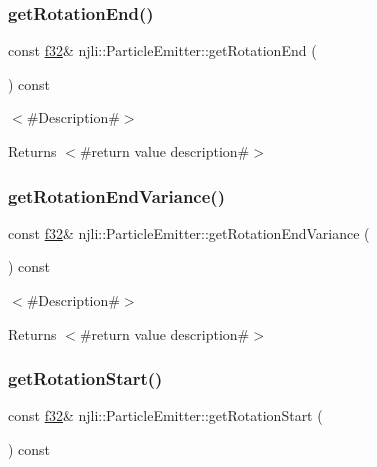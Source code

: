 \subsubsection{\texorpdfstring{get\+Rotation\+End()}{getRotationEnd()}}
{\footnotesize\ttfamily const \mbox{\hyperlink{_util_8h_a5f6906312a689f27d70e9d086649d3fd}{f32}}\& njli\+::\+Particle\+Emitter\+::get\+Rotation\+End (\begin{DoxyParamCaption}{ }\end{DoxyParamCaption}) const}

$<$\#\+Description\#$>$

\begin{DoxyReturn}{Returns}
$<$\#return value description\#$>$ 
\end{DoxyReturn}
\mbox{\label{classnjli_1_1_particle_emitter_ab961f9c25254a11ed565598ea2855b6d}} 
\subsubsection{\texorpdfstring{get\+Rotation\+End\+Variance()}{getRotationEndVariance()}}
{\footnotesize\ttfamily const \mbox{\hyperlink{_util_8h_a5f6906312a689f27d70e9d086649d3fd}{f32}}\& njli\+::\+Particle\+Emitter\+::get\+Rotation\+End\+Variance (\begin{DoxyParamCaption}{ }\end{DoxyParamCaption}) const}

$<$\#\+Description\#$>$

\begin{DoxyReturn}{Returns}
$<$\#return value description\#$>$ 
\end{DoxyReturn}
\mbox{\label{classnjli_1_1_particle_emitter_ac9af97a8b1f2d5a87ebac058ec70e835}} 
\subsubsection{\texorpdfstring{get\+Rotation\+Start()}{getRotationStart()}}
{\footnotesize\ttfamily const \mbox{\hyperlink{_util_8h_a5f6906312a689f27d70e9d086649d3fd}{f32}}\& njli\+::\+Particle\+Emitter\+::get\+Rotation\+Start (\begin{DoxyParamCaption}{ }\end{DoxyParamCaption}) const}

